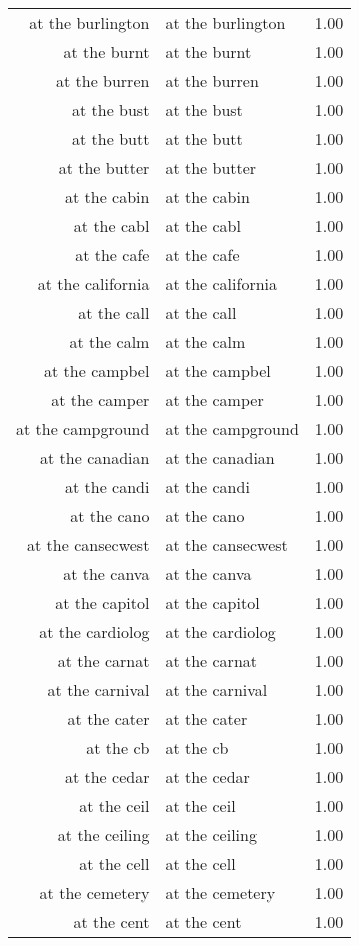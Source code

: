\begin{table}[ht]
\begin{tabular}{rlr}
  at the burlington & at the burlington & 1.00 \\ 
  at the burnt & at the burnt & 1.00 \\ 
  at the burren & at the burren & 1.00 \\ 
  at the bust & at the bust & 1.00 \\ 
  at the butt & at the butt & 1.00 \\ 
  at the butter & at the butter & 1.00 \\ 
  at the cabin & at the cabin & 1.00 \\ 
  at the cabl & at the cabl & 1.00 \\ 
  at the cafe & at the cafe & 1.00 \\ 
  at the california & at the california & 1.00 \\ 
  at the call & at the call & 1.00 \\ 
  at the calm & at the calm & 1.00 \\ 
  at the campbel & at the campbel & 1.00 \\ 
  at the camper & at the camper & 1.00 \\ 
  at the campground & at the campground & 1.00 \\ 
  at the canadian & at the canadian & 1.00 \\ 
  at the candi & at the candi & 1.00 \\ 
  at the cano & at the cano & 1.00 \\ 
  at the cansecwest & at the cansecwest & 1.00 \\ 
  at the canva & at the canva & 1.00 \\ 
  at the capitol & at the capitol & 1.00 \\ 
  at the cardiolog & at the cardiolog & 1.00 \\ 
  at the carnat & at the carnat & 1.00 \\ 
  at the carnival & at the carnival & 1.00 \\ 
  at the cater & at the cater & 1.00 \\ 
  at the cb & at the cb & 1.00 \\ 
  at the cedar & at the cedar & 1.00 \\ 
  at the ceil & at the ceil & 1.00 \\ 
  at the ceiling & at the ceiling & 1.00 \\ 
  at the cell & at the cell & 1.00 \\ 
  at the cemetery & at the cemetery & 1.00 \\ 
  at the cent & at the cent & 1.00 \\ 

\end{tabular}
\end{table}
